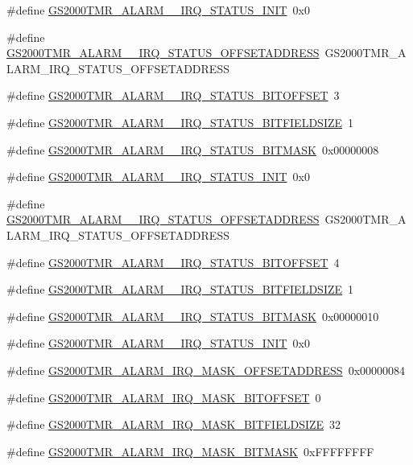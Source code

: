 \begin{DoxyCompactItemize}
\item 
\#define \hyperlink{a00556_a3cac7fbc79f0ead86313b286f503fe1e}{GS2000TMR\_\-ALARM\_\_\-IRQ\_\-STATUS\_\-INIT}~0x0
\item 
\#define \hyperlink{a00556_af429e5a8a1d8dda23fce7bb4e755b85e}{GS2000TMR\_\-ALARM\_\_\-IRQ\_\-STATUS\_\-OFFSETADDRESS}~GS2000TMR\_\-ALARM\_\-IRQ\_\-STATUS\_\-OFFSETADDRESS
\item 
\#define \hyperlink{a00556_ae9fd3487763ce892e7230bba48dd1b82}{GS2000TMR\_\-ALARM\_\_\-IRQ\_\-STATUS\_\-BITOFFSET}~3
\item 
\#define \hyperlink{a00556_a61cdd638226cbe7a18e35c259f1cf16b}{GS2000TMR\_\-ALARM\_\_\-IRQ\_\-STATUS\_\-BITFIELDSIZE}~1
\item 
\#define \hyperlink{a00556_a85f4da2b9190b43e23bcd47f7f563ad4}{GS2000TMR\_\-ALARM\_\_\-IRQ\_\-STATUS\_\-BITMASK}~0x00000008
\item 
\#define \hyperlink{a00556_af7e12a5c62e4e32eef90aaf83c4ae895}{GS2000TMR\_\-ALARM\_\_\-IRQ\_\-STATUS\_\-INIT}~0x0
\item 
\#define \hyperlink{a00556_a4959026e3b0a41d9978111a433c87a87}{GS2000TMR\_\-ALARM\_\_\-IRQ\_\-STATUS\_\-OFFSETADDRESS}~GS2000TMR\_\-ALARM\_\-IRQ\_\-STATUS\_\-OFFSETADDRESS
\item 
\#define \hyperlink{a00556_a85062a2600b81eb6f636d0660d0d3f46}{GS2000TMR\_\-ALARM\_\_\-IRQ\_\-STATUS\_\-BITOFFSET}~4
\item 
\#define \hyperlink{a00556_ab69083f17097e9fe02eaa4413336a0c7}{GS2000TMR\_\-ALARM\_\_\-IRQ\_\-STATUS\_\-BITFIELDSIZE}~1
\item 
\#define \hyperlink{a00556_a84426316d9673289e29c813b5309ed1e}{GS2000TMR\_\-ALARM\_\_\-IRQ\_\-STATUS\_\-BITMASK}~0x00000010
\item 
\#define \hyperlink{a00556_a61dd6a9cef051154060e38ac01e1bec0}{GS2000TMR\_\-ALARM\_\_\-IRQ\_\-STATUS\_\-INIT}~0x0
\item 
\#define \hyperlink{a00556_a21ba38d0bd4092246900629fa5708ecd}{GS2000TMR\_\-ALARM\_\-IRQ\_\-MASK\_\-OFFSETADDRESS}~0x00000084
\item 
\#define \hyperlink{a00556_ab4a07f29fafc223188bc2e5c3f77ca02}{GS2000TMR\_\-ALARM\_\-IRQ\_\-MASK\_\-BITOFFSET}~0
\item 
\#define \hyperlink{a00556_a077d351e7f3149d7d01dcc2a99861e6c}{GS2000TMR\_\-ALARM\_\-IRQ\_\-MASK\_\-BITFIELDSIZE}~32
\item 
\#define \hyperlink{a00556_a69fd5d9aa17ca80b4e3e823a3f36fe1f}{GS2000TMR\_\-ALARM\_\-IRQ\_\-MASK\_\-BITMASK}~0xFFFFFFFF

\end{DoxyCompactItemize}
